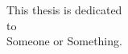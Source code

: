 %
%
%
%

\vspace{-5in}
\begin{centering}
This thesis is dedicated\\
to\\
Someone or Something.
\end{centering}
